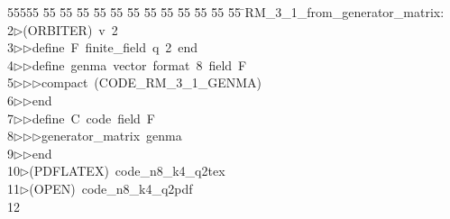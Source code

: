 %
%
\begin{tabbing}
55555 \= 55 \= 55 \= 55 \= 55 \= 55 \= 55 \= 55 \= 55 \= 55 \= 55 \= 55 \= 55 \= \>RM\_3\_1\_from\_generator\_matrix:\\[0pt]
2\>$\triangleright$\>(ORBITER)\ v\ 2\ \\[0pt]
3\>$\triangleright$\>$\triangleright$\>define\ F\ finite\_field\ q\ 2\ end\ \\[0pt]
4\>$\triangleright$\>$\triangleright$\>define\ genma\ vector\ format\ 8\ field\ F\ \\[0pt]
5\>$\triangleright$\>$\triangleright$\>$\triangleright$\>compact\ (CODE\_RM\_3\_1\_GENMA)\ \\[0pt]
6\>$\triangleright$\>$\triangleright$\>end\ \\[0pt]
7\>$\triangleright$\>$\triangleright$\>define\ C\ code\ field\ F\ \\[0pt]
8\>$\triangleright$\>$\triangleright$\>$\triangleright$\>generator\_matrix\ genma\ \\[0pt]
9\>$\triangleright$\>$\triangleright$\>end\\[0pt]
10\>$\triangleright$\>(PDFLATEX)\ code\_n8\_k4\_q2tex\\[0pt]
11\>$\triangleright$\>(OPEN)\ code\_n8\_k4\_q2pdf\\[0pt]
12\>\end{tabbing}
